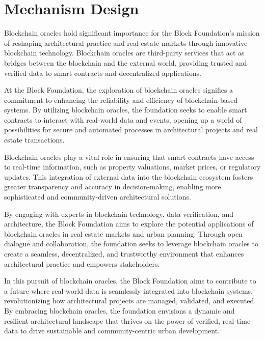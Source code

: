\section{Mechanism Design}


Blockchain oracles hold significant importance for the Block Foundation's mission of reshaping architectural practice and real estate markets through innovative blockchain technology. Blockchain oracles are third-party services that act as bridges between the blockchain and the external world, providing trusted and verified data to smart contracts and decentralized applications.

At the Block Foundation, the exploration of blockchain oracles signifies a commitment to enhancing the reliability and efficiency of blockchain-based systems. By utilizing blockchain oracles, the foundation seeks to enable smart contracts to interact with real-world data and events, opening up a world of possibilities for secure and automated processes in architectural projects and real estate transactions.

Blockchain oracles play a vital role in ensuring that smart contracts have access to real-time information, such as property valuations, market prices, or regulatory updates. This integration of external data into the blockchain ecosystem fosters greater transparency and accuracy in decision-making, enabling more sophisticated and community-driven architectural solutions.

By engaging with experts in blockchain technology, data verification, and architecture, the Block Foundation aims to explore the potential applications of blockchain oracles in real estate markets and urban planning. Through open dialogue and collaboration, the foundation seeks to leverage blockchain oracles to create a seamless, decentralized, and trustworthy environment that enhances architectural practice and empowers stakeholders.

In this pursuit of blockchain oracles, the Block Foundation aims to contribute to a future where real-world data is seamlessly integrated into blockchain systems, revolutionizing how architectural projects are managed, validated, and executed. By embracing blockchain oracles, the foundation envisions a dynamic and resilient architectural landscape that thrives on the power of verified, real-time data to drive sustainable and community-centric urban development.
